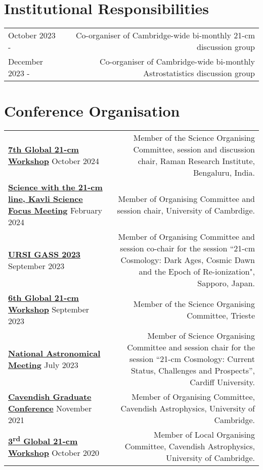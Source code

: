 \documentclass{article}
\begin{document}
\section*{Institutional Responsibilities}

\begin{tabular}{L!{\vrule}R}
    October 2023 - & Co-organiser of Cambridge-wide bi-monthly 21-cm discussion group \\
    December 2023 - & Co-organiser of Cambridge-wide bi-monthly Astrostatistics discussion group \\
\end{tabular}

\section*{Conference Organisation}

\begin{tabular}{l!{\vrule}r}
    \href{https://sites.google.com/view/global-21-cm-workshop}{\textbf{7th Global 21-cm Workshop}} October 2024 & Member of the Science Organising Committee, session and discussion chair, Raman Research Institute, Bengaluru, India. \\
    \href{https://www.kicc.cam.ac.uk/events/kavli-science-themed-meetings/science-21-cm-hydrogen-line}{\textbf{Science with the 21-cm line, Kavli Science Focus Meeting}} February 2024 & Member of Organising Committee and session chair, University of Cambrdige. \\
    \href{https://www.ursi-gass2023.jp}{\textbf{URSI GASS 2023}} September 2023 & Member of Organising Committee and session co-chair for the session ``21-cm Cosmology: Dark Ages, Cosmic Dawn and the Epoch of Re-ionization", Sapporo, Japan. \\
    \href{https://global21cmworkshop.org/2023-ifpu/}{\textbf{6th Global 21-cm Workshop}} September 2023 & Member of the Science Organising Committee, Trieste \\
    \href{https://nam2023.org}{\textbf{National Astronomical Meeting}} July 2023 & Member of Science Organising Committee and session chair for the session “21-cm Cosmology: Current Status, Challenges and Prospects”, Cardiff University. \\
	\href{http://cavgradcon.soc.srcf.net/index.html}{\textbf{Cavendish Graduate Conference}} November 2021 & Member of Organising Committee, Cavendish Astrophysics, University of Cambridge.\\
	\href{https://sites.google.com/view/third21cmglobalworkshop/home?authuser=0}{\textbf{3\textsuperscript{rd} Global 21-cm Workshop}} October 2020 & Member of Local Organising Committee, Cavendish Astrophysics, University of Cambridge.	
\end{tabular}
\end{document}
